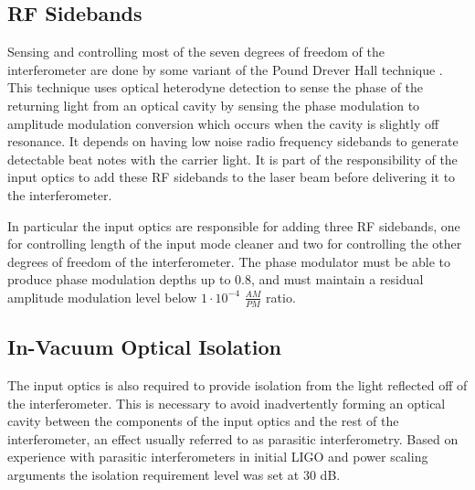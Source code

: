 \documentclass[10pt]{article}
\begin{document}
\subsection{RF Sidebands}
Sensing and controlling most of the seven degrees of freedom of the interferometer are done by some 
variant of the Pound Drever Hall technique \cite{PDH}.  
This technique uses optical heterodyne detection to sense the phase of the returning light from 
an optical cavity by sensing the phase modulation to amplitude modulation conversion which occurs 
when the cavity is slightly off resonance.  
It depends on having low noise radio frequency sidebands to generate detectable beat notes 
with the carrier light.
It is part of the responsibility of the input optics to add these RF sidebands to the laser beam 
before delivering it to the interferometer.  

In particular the input optics are responsible for adding three RF sidebands, one for controlling 
length of the input mode cleaner and two for controlling the other degrees of freedom of the 
interferometer.  
The phase modulator must be able to produce phase modulation depths up to 0.8, and must 
maintain a residual amplitude modulation level below $1\cdot10^{-4}$ $\frac{AM}{PM}$ ratio.  


\subsection{In-Vacuum Optical Isolation}
The input optics is also required to provide isolation from the light reflected off of the 
interferometer.  
This is necessary to avoid inadvertently forming an optical cavity between the components 
of the input optics and the rest of the interferometer, 
an effect usually referred to as parasitic interferometry.  
Based on experience with parasitic interferometers in initial LIGO and power scaling arguments 
the isolation requirement level was set at 30 dB\cite{ligoT020020}.  


\end{document}
